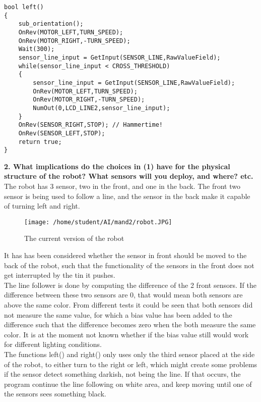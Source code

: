 \documentclass[10pt,a4paper]{article}
\begin{document}
     
\begin{lstlisting}
bool left()
{
    sub_orientation();
    OnRev(MOTOR_LEFT,TURN_SPEED);
    OnRev(MOTOR_RIGHT,-TURN_SPEED);
    Wait(300);  
    sensor_line_input = GetInput(SENSOR_LINE,RawValueField);
    while(sensor_line_input < CROSS_THRESHOLD)
    {       
        sensor_line_input = GetInput(SENSOR_LINE,RawValueField);
        OnRev(MOTOR_LEFT,TURN_SPEED);
        OnRev(MOTOR_RIGHT,-TURN_SPEED);        
        NumOut(0,LCD_LINE2,sensor_line_input);
    }  
    OnRev(SENSOR_RIGHT,STOP); // Hammertime!
    OnRev(SENSOR_LEFT,STOP);  
    return true;
}
\end{lstlisting}
    
     
   \textbf{2.  What implications do the choices in (1) have for the physical structure of the
     robot?  What sensors will you deploy, and where?  etc.}\\


The robot has 3 sensor,  two in the front, and one in the back.  The front two sensor is being used to follow a line, and the sensor in the back make it capable of turning left and right. 
	\begin{figure}[H]
	\begin{center}
    \texttt{[image: /home/student/AI/mand2/robot.JPG]}
  \end{center}
  \caption{The current version of the robot}
\end{figure}   			

It has has been considered  whether the sensor in front should be moved to the back of the robot, such that the functionality of the sensors in the front does not get interrupted by the tin it pushes. \\


The line follower is done by computing the difference of the 2 front sensors.  If the difference between these two sensors are 0, that would mean both sensors are above the same color.    From different tests it could be seen that both sensors did not measure the same value, for which a bias value has been added to the difference such that the difference becomes zero when the both measure the same color.  It is at the moment not known whether if the bias value still would work for different lighting conditions.\\

The functions left() and right() only uses only the third sensor placed at the side of the robot, to either turn to the right or left,  which might create some problems if the sensor detect something darkish, not being the line.  If that occurs, the program continue the line following on white area, and keep moving until one of the sensors sees something black.\\\\
 
\end{document}
